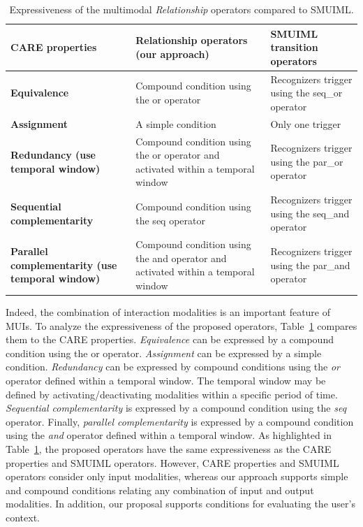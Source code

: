\documentclass[
  doutorado,
  american
]{ThesisPUC}
\newcommand{\tab}[1]{Table~\ref{#1}}
\begin{document}
\begin{table}[b!]
\scriptsize
\def\arraystretch{1.3}
\begin{tabular}{ m{4cm} m{4.5cm} m{4.5cm}}
	\hline
	\textbf{CARE properties} & \textbf{Relationship operators \newline (our approach)} & \textbf{SMUIML transition operators} \\
	\hline
	
	\textbf{Equivalence} &	Compound condition using the or operator &	
	Recognizers 
	trigger using the seq\_or operator \\
	\hline
	\textbf{Assignment} &	A simple condition &	Only one trigger \\
	\hline
	\textbf{Redundancy (use temporal window)} & Compound condition using the or 
	operator 
	and activated within a temporal window &	Recognizers trigger using the 
	par\_or operator \\
	\hline
	\textbf{Sequential complementarity} & Compound condition using the seq 
	operator &	
	Recognizers trigger using the seq\_and operator \\
	\hline
	\textbf{Parallel complementarity (use temporal window)} & Compound 
	condition using 
	the and operator and activated within a temporal window &	Recognizers 
	trigger using the par\_and operator \\ 
	\hline

\end{tabular}
\caption{Expressiveness of the multimodal \textit{Relationship} operators 
compared to 
SMUIML.}
\label{table:care}
\end{table}

Indeed, the combination of interaction modalities is an important feature of
MUIs. To analyze the expressiveness of the proposed operators, 
\tab{table:care} compares them to the CARE properties. \textit{Equivalence} can
be expressed by a compound condition using the or operator. \textit{Assignment}
can be expressed by a simple condition. \textit{Redundancy} can be expressed by
compound conditions using the \textit{or} operator defined within a temporal
window. The temporal window may be defined by activating/deactivating modalities
within a specific period of time. 
\textit{Sequential complementarity} is expressed by a compound condition using
the \textit{seq} operator. Finally, \textit{parallel complementarity} is
expressed by a compound condition using the \textit{and} operator defined within
a temporal window. As highlighted in \tab{table:care}, the proposed operators
have the same expressiveness as the CARE properties and SMUIML operators.
However, CARE properties and SMUIML operators consider only input modalities,
whereas our approach supports simple and compound conditions relating any
combination of input and output modalities. In addition, our proposal supports
conditions for evaluating the user’s context.
\end{document}

